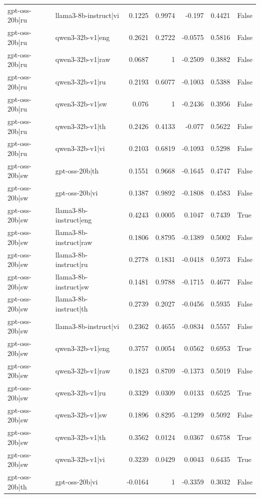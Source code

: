 \begin{table}
\begin{tabular}{l l r r r r l}
gpt-oss-20b|ru & llama3-8b-instruct|vi & 0.1225 & 0.9974 & -0.197 & 0.4421 & False \\
gpt-oss-20b|ru & qwen3-32b-v1|eng & 0.2621 & 0.2722 & -0.0575 & 0.5816 & False \\
gpt-oss-20b|ru & qwen3-32b-v1|raw & 0.0687 & 1 & -0.2509 & 0.3882 & False \\
gpt-oss-20b|ru & qwen3-32b-v1|ru & 0.2193 & 0.6077 & -0.1003 & 0.5388 & False \\
gpt-oss-20b|ru & qwen3-32b-v1|sw & 0.076 & 1 & -0.2436 & 0.3956 & False \\
gpt-oss-20b|ru & qwen3-32b-v1|th & 0.2426 & 0.4133 & -0.077 & 0.5622 & False \\
gpt-oss-20b|ru & qwen3-32b-v1|vi & 0.2103 & 0.6819 & -0.1093 & 0.5298 & False \\
gpt-oss-20b|sw & gpt-oss-20b|th & 0.1551 & 0.9668 & -0.1645 & 0.4747 & False \\
gpt-oss-20b|sw & gpt-oss-20b|vi & 0.1387 & 0.9892 & -0.1808 & 0.4583 & False \\
gpt-oss-20b|sw & llama3-8b-instruct|eng & 0.4243 & 0.0005 & 0.1047 & 0.7439 & True \\
gpt-oss-20b|sw & llama3-8b-instruct|raw & 0.1806 & 0.8795 & -0.1389 & 0.5002 & False \\
gpt-oss-20b|sw & llama3-8b-instruct|ru & 0.2778 & 0.1831 & -0.0418 & 0.5973 & False \\
gpt-oss-20b|sw & llama3-8b-instruct|sw & 0.1481 & 0.9788 & -0.1715 & 0.4677 & False \\
gpt-oss-20b|sw & llama3-8b-instruct|th & 0.2739 & 0.2027 & -0.0456 & 0.5935 & False \\
gpt-oss-20b|sw & llama3-8b-instruct|vi & 0.2362 & 0.4655 & -0.0834 & 0.5557 & False \\
gpt-oss-20b|sw & qwen3-32b-v1|eng & 0.3757 & 0.0054 & 0.0562 & 0.6953 & True \\
gpt-oss-20b|sw & qwen3-32b-v1|raw & 0.1823 & 0.8709 & -0.1373 & 0.5019 & False \\
gpt-oss-20b|sw & qwen3-32b-v1|ru & 0.3329 & 0.0309 & 0.0133 & 0.6525 & True \\
gpt-oss-20b|sw & qwen3-32b-v1|sw & 0.1896 & 0.8295 & -0.1299 & 0.5092 & False \\
gpt-oss-20b|sw & qwen3-32b-v1|th & 0.3562 & 0.0124 & 0.0367 & 0.6758 & True \\
gpt-oss-20b|sw & qwen3-32b-v1|vi & 0.3239 & 0.0429 & 0.0043 & 0.6435 & True \\
gpt-oss-20b|th & gpt-oss-20b|vi & -0.0164 & 1 & -0.3359 & 0.3032 & False \\

\end{tabular}
\end{table}
